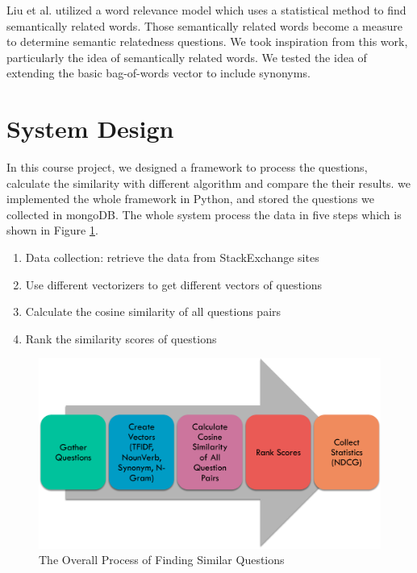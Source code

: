 \documentclass{acm_proc_article-sp}
\begin{document}
Liu et al. \cite{liu2009searching} utilized a word relevance model which uses a  statistical method to find semantically related words. Those semantically related words become a measure to determine semantic relatedness questions. We took inspiration from this work, particularly the idea of semantically related words. We tested the idea of extending the basic bag-of-words vector to include synonyms. 






\section{System Design}
In this course project, we designed a framework to process the questions, 
calculate the similarity with different algorithm and compare the their results. 
we implemented the whole framework in Python, and stored the questions we collected in mongoDB.  
The whole system process the data in five steps which  is shown in Figure \ref{fig:structure}.
\begin{enumerate}[noitemsep]
	\item Data collection:  retrieve the data from StackExchange sites 
	\item Use different vectorizers to get different vectors of questions 
	\item Calculate the cosine similarity of all questions pairs
	\item Rank  the similarity scores of questions
\end{enumerate}

\begin{figure}[h]
\centering
\includegraphics[width=1\columnwidth]{images/overall_structure.pdf}
\caption{The Overall Process of  Finding Similar Questions}
\label{fig:structure}
\end{figure}
\end{document}
